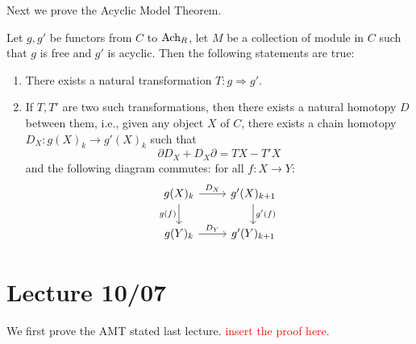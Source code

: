 Next we prove the Acyclic Model Theorem.
\begin{thm}[AMT]
    Let $g,g'$ be functors from $C$ to $\text{Ach}_R$, let $M$ be a collection of module in $C$ such that $g$ is free and $g'$ is acyclic. Then the following statements are true:
    \begin{enumerate}
        \item There exists a natural transformation $T:g\Rightarrow g'$.
        \item If $T,T'$ are two such transformations, then there exists a natural homotopy $D$ between them, i.e., given any object $X$ of $C$, there exists a chain homotopy $D_X:g(X)_k\to g'(X)_k$ such that 
        \begin{equation*}
            \partial D_X+D_X\partial=TX-T'X
        \end{equation*}
        and the following diagram commutes: for all $f:X\to Y$:
        \[\begin{tikzcd}
            {g(X)_k} & {g'(X)_{k+1}} \\
            {g(Y)_k} & {g'(Y)_{k+1}}
            \arrow["{D_X}", from=1-1, to=1-2]
            \arrow["{g(f)}"', from=1-1, to=2-1]
            \arrow["{g'(f)}", from=1-2, to=2-2]
            \arrow["{D_Y}", from=2-1, to=2-2]
        \end{tikzcd}\]
    \end{enumerate}
\end{thm}



\section{Lecture 10/07}
We first prove the AMT stated last lecture.
\textcolor{red}{insert the proof here.}

